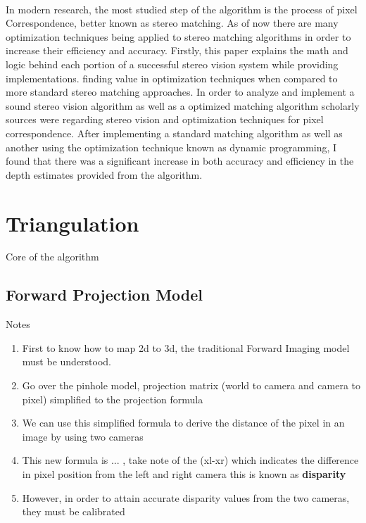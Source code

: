 \documentclass[11pt]{scrartcl}
\begin{document}
\\

In modern research, the most studied step of the algorithm is the process of pixel Correspondence, 
better known as stereo matching. As of now there are many optimization techniques being applied 
to stereo matching algorithms in order to increase their efficiency and accuracy. Firstly, this paper explains 
the math and logic behind each portion of a successful stereo vision system while providing implementations.  finding value in optimization techniques 
when compared to more standard stereo matching approaches. In order to analyze and implement a sound stereo vision algorithm 
as well as a optimized matching algorithm scholarly sources were regarding stereo vision and optimization 
techniques for pixel correspondence. After implementing a standard matching algorithm as well as another using 
the optimization technique known as dynamic programming, I found that there was a significant increase
in both accuracy and efficiency in the depth estimates provided from the algorithm. 


\section{Triangulation}
Core of the algorithm

\subsection{Forward Projection Model}
\begin{remark}
    Notes{\begin{enumerate}
        \item First to know how to map 2d to 3d, the traditional Forward Imaging model must be understood. 
        \item Go over the pinhole model, projection matrix (world to camera and camera to pixel) simplified to the projection formula
        \item We can use this simplified formula to derive the distance of the pixel in an image by using two cameras
        \item This new formula is ... , take note of the (xl-xr) which indicates the difference in pixel position from the left and right camera
            this is known as \textbf{disparity}
        \item However, in order to attain accurate disparity values from the two cameras, they must be calibrated 
    \end{enumerate}} %
    \label{par:Notes}
    
\end{remark}
\end{document}
